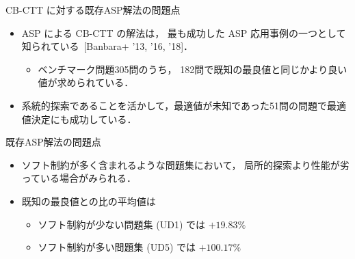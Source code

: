 \documentclass[11pt,dvipdfmx,handout]{beamer}
\begin{document}
\begin{frame}{CB-CTT に対する既存ASP解法の問題点}
  \begin{itemize}
  \item ASP による CB-CTT の解法は，
    最も成功した ASP 応用事例の一つとして知られている~[Banbara+ '13, '16, '18]．
    \begin{itemize}
    \item ベンチマーク問題305問のうち，
      182問で既知の最良値と同じかより良い値が求められている．
    \end{itemize}
  \item 系統的探索であることを活かして，最適値が未知であった51問の問題で最適値決定にも成功している．
  \end{itemize}
  \begin{alertblock}{既存ASP解法の問題点}
    \begin{itemize}
    \item ソフト制約が多く含まれるような問題集において，
      局所的探索より性能が劣っている場合がみられる．
     \item 既知の最良値との比の平均値は
       \begin{itemize}
       \item ソフト制約が少ない問題集 (UD1) では $+19.83\%$
       \item ソフト制約が多い問題集 (UD5) では $+100.17\%$
       \end{itemize}
    \end{itemize}
  \end{alertblock}
\end{frame}

%
\end{document}
